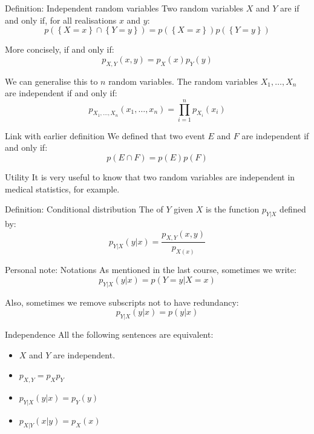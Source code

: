 \documentclass[a4paper]{article}
\begin{document}
\begin{parag}{Definition: Independent random variables}
    Two random variables $X$ and $Y$ are  if and only if, for all realisations $x$ and $y$: 
    \[p\left(\left\{X = x\right\} \cap \left\{Y = y\right\}\right) = p\left(\left\{X = x\right\}\right) p\left(\left\{Y = y\right\}\right)\]
    
    More concisely, if and only if:
    \[p_{X, Y}\left(x, y\right) = p_X\left(x\right)p_Y\left(y\right) \]
    
    We can generalise this to $n$ random variables. The random variables $X_1, \ldots, X_n$ are independent if and only if: 
    \[p_{X_1, \ldots, X_n}\left(x_1, \ldots, x_n\right) = \prod_{i=1}^{n} p_{X_i}\left(x_i\right)\]

    \begin{subparag}{Link with earlier definition}
        We defined that two event $E$ and $F$ are independent if and only if: 
        \[p\left(E \cap F\right) = p\left(E\right)p\left(F\right)\]
    \end{subparag}
    
    \begin{subparag}{Utility}
        It is very useful to know that two random variables are independent in medical statistics, for example.
    \end{subparag}
\end{parag}

\begin{parag}{Definition: Conditional distribution}
    The  of $Y$ given $X$ is the function $p_{Y | X}$ defined by: 
    \[p_{Y|X}\left(y | x\right) = \frac{p_{X, Y}\left(x, y\right)}{p_{X\left(x\right)}}\]

    \begin{subparag}{Personal note: Notations}
        As mentioned in the last course, sometimes we write: 
        \[p_{Y|X}\left(y|x\right) = p\left(Y = y | X = x\right)\]
        
        Also, sometimes we remove subscripts not to have redundancy: 
        \[p_{Y|X}\left(y|x\right) = p\left(y|x\right)\]
        
    \end{subparag}
\end{parag}

\begin{parag}{Independence}
    All the following sentences are equivalent:
    \begin{itemize}
        \item $X$ and $Y$ are independent.
        \item $\displaystyle p_{X, Y} = p_{X} p_Y$
        \item $\displaystyle p_{Y | X}\left(y | x\right) = p_Y\left(y\right)$ 
        \item $\displaystyle p_{X | Y}\left(x|y\right) = p_{X}\left(x\right)$
    \end{itemize}
\end{parag}
\end{document}

